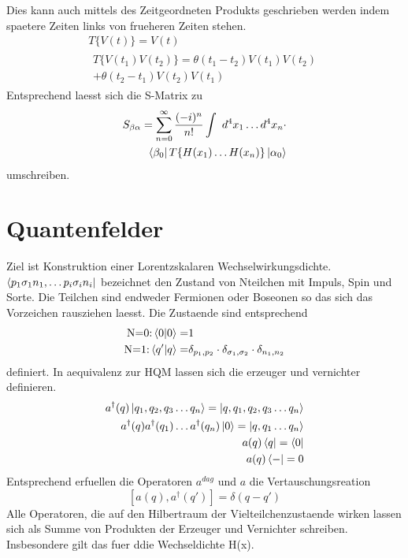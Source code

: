 \documentclass[11pt,a4paper,twocolumn]{article}
\begin{document}
Dies kann auch mittels des Zeitgeordneten Produkts geschrieben werden indem 
spaetere Zeiten links von frueheren Zeiten stehen.
\begin{eqnarray}
		T\{V(t)\} = V(t) \\
		\begin{split}
				T\{V(t_1)V(t_2)\} = \theta(t_1 -t_2)V(t_1)V(t_2) \\ + \theta(t_2 -t_1)V(t_2)V(t_1)
		\end{split}
\end{eqnarray}
Entsprechend laesst sich die S-Matrix zu 
\begin{equation}
		\begin{split}
				S_{\beta \alpha} = \sum^{\infty}_{n=0} \frac{(-i)^n}{n!} \int \ d^4x_1
				\dots d^4x_n \cdot \\ \bra{\beta_0} T\{H(x_1) \dots H(x_n)\} \ket{\alpha_0}
		\end{split}
\end{equation}
umschreiben.

\section{Quantenfelder}
Ziel ist Konstruktion einer Lorentzskalaren Wechselwirkungsdichte.
$\bra{p_1 \sigma_1 n_1, \ldots p_i \sigma_i n_i}$ bezeichnet den Zustand von
Nteilchen mit Impuls, Spin und Sorte. Die Teilchen sind endweder Fermionen oder
Boseonen so das sich das Vorzeichen rausziehen laesst.
Die Zustaende sind entsprechend
\begin{eqnarray}
		\text{N=0:} \braket{0}{0} =& 1 \\
		\text{N=1:} \braket{q'}{q} =& \delta_{p_1,p_2} \cdot
\delta_{\sigma_1,\sigma_2} \cdot \delta_{n_1,n_2}
\end{eqnarray}
definiert.
In aequivalenz zur HQM lassen sich die erzeuger und vernichter definieren.
\begin{eqnarray}
		a^{\dag}(q)\ket{q_1,q_2,q_3 \dots q_n} = \ket{q,q_1,q_2,q_3 \dots q_n}
		\\
		a^{\dag}(q) a^{\dag}(q_1) \dots a^{\dag}(q_n) \ket{0} = 
		\ket{q,q_1 \dots q_n}\\
		a(q) \bra{q} = \bra{0} \\
		a(q) \bra{-} = 0 
\end{eqnarray}
Entsprechend erfuellen die Operatoren $a^{dag}$ und $a$ die Vertauschungsreation
\begin{equation}
		\left[a(q),a^{\dag}(q')\right]= \delta(q-q')
\end{equation}
Alle Operatoren, die auf den Hilbertraum der Vielteilchenzustaende wirken lassen
sich als Summe von Produkten der Erzeuger und Vernichter schreiben. 
Insbesondere gilt das fuer ddie Wechseldichte H(x).
\end{document}
